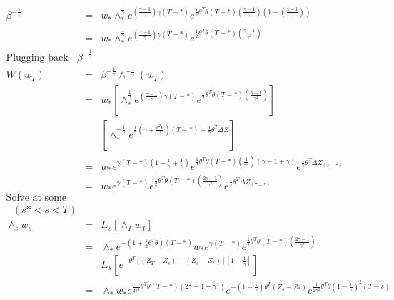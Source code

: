 \documentclass[]{article}
\begin{document}
\begin{eqnarray*}
\beta ^{-\frac{1}{\gamma}} &=& w_* \wedge _*^{\frac{1}{\gamma}} e^{\left( \frac{\gamma -1}{\gamma}\right)\gamma \left(T-*\right)} e^{\frac{1}{2} \theta ^T \theta \left( T-* \right) \left(\frac{\gamma -1}{\gamma}\right)\left(1-\left(\frac{\gamma -1}{\gamma}\right)\right)}\\
&=& w_* \wedge _*^{\frac{1}{\gamma}} e^{\left( \frac{\gamma -1}{\gamma}\right)\gamma \left(T-*\right)} e^{\frac{1}{2} \theta ^T \theta \left( T-* \right) \left(\frac{\gamma -1}{\gamma ^2}\right)}\\
\mbox{Plugging back for } \beta ^{-\frac{1}{\gamma}}\\
W(w_T) &=& \beta ^{-\frac{1}{\gamma}} \wedge ^{-\frac{1}{\gamma}} \left(w_T\right)\\
&=& w_* \left[ \wedge _*^{\frac{1}{\gamma}} e^{\left( \frac{\gamma -1}{\gamma}\right)\gamma \left(T-*\right)} e^{\frac{1}{2} \theta ^T \theta \left( T-* \right) \left(\frac{\gamma -1}{\gamma ^2}\right)} \right] \\
&&\left[ \wedge _*^{-\frac{1}{\gamma}} e^{\frac{1}{\gamma} \left(\gamma + \frac{\theta ^T \theta}{2}\right) \left( T-*\right) + \frac{1}{\gamma} \theta ^T \Delta Z}\right]\\
&=& w_* e^{\gamma \left(T-*\right) \left(1-\frac{1}{\gamma}+\frac{1}{\gamma}\right)} e^{\frac{1}{2} \theta ^T \theta \left(T-*\right) \left( \frac{1}{\gamma ^2}\right) \left(\gamma -1 +\gamma \right)} e^{\frac{1}{\gamma} \theta ^T \Delta Z_{(T-*)}}\\
&=& w_* e^{\gamma \left(T-*\right)} e^{\frac{1}{2} \theta ^T \theta \left(T-*\right) \left( \frac{2\gamma - 1}{\gamma ^2}\right)} e^{\frac{1}{\gamma} \theta ^T \Delta Z_{(T-*)}}\\
\mbox{Solve at some intermediate date}\\
\mbox{ $(s *<s<T)$}\\
\wedge _s w_s &=& E_s \left[ \wedge _T w_T\right]\\
&=& \wedge _* e^{-\left(1+ \frac{1}{2} \theta ^T \theta \right) \left( T-* \right)} w_* e^{\gamma (T-*)} e^{\frac{1}{2} \theta ^T \theta \left(T-*\right)\left(\frac{2\gamma -1}{\gamma ^2}\right)}\\
&& E_s\left[e^{-\theta ^T \left[\left(Z_T-Z_s\right)+\left(Z_s - Z_*\right)\right]\left[1-\frac{1}{\gamma}\right]}\right]\\
&=& \wedge _* w_* e^{\frac{1}{2\gamma ^2} \theta ^T \theta \left(T-*\right)\left(2\gamma -1-\gamma ^2\right)} e^{-\left(1-\frac{1}{\gamma}\right)\theta ^T \left(Z_s -Z_*\right)} e^{\frac{1}{2\gamma ^2} \theta ^T \theta \left(1-\frac{1}{\gamma}\right) ^2 \left(T-s\right)}\\

\end{eqnarray*}
\end{document}
